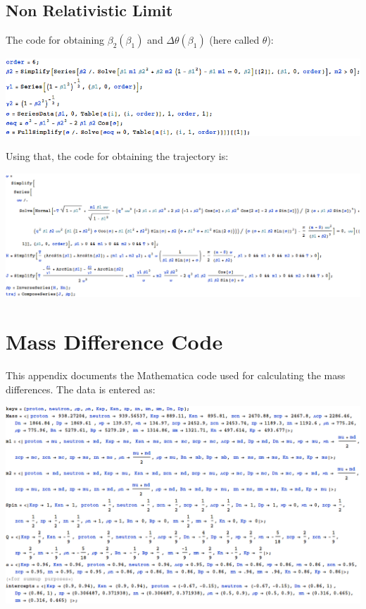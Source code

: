 \documentclass[11pt,a4paper]{article}
\begin{document}
\subsection{Non Relativistic Limit}
The code for obtaining $\beta_2\left(\beta_1\right)$ and $\Delta\theta\left(\beta_1\right)$ (here called $\theta$):

\includegraphics[width=\linewidth]{figures/AnalyticNonRelativisticKin}

Using that, the code for obtaining the trajectory is:

\includegraphics[width=\linewidth]{figures/AnalyticNonRelativisticRegge}
\FloatBarrier
\section{Mass Difference Code}
This appendix documents the Mathematica code used for calculating the mass differences. The data is entered as:

\includegraphics[width=\linewidth]{figures/MassDifferencesData}
\end{document}
